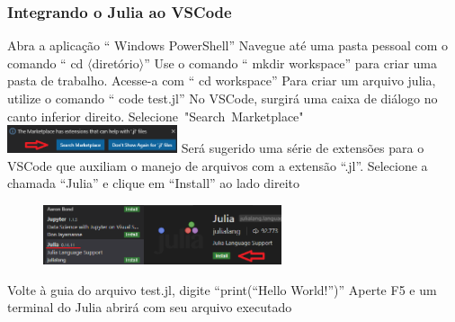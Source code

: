 \documentclass{beamer}
\begin{document}
	\begin{frame}
		\frametitle{\normalsize Integrando o Julia ao VSCode}
		\begin{algorithm}[H]
			\small
			Abra a aplicação ``\color{cyan} Windows PowerShell\color{black}''\; 
			Navegue até uma pasta pessoal com o comando ``\color{cyan} cd \color{black} $\langle$diretório$\rangle$''\;
			Use o comando ``\color{cyan} mkdir workspace\color{black}'' para criar uma pasta de trabalho. Acesse-a com ``\color{cyan} cd workspace\color{black}''\;
			Para criar um arquivo julia, utilize o comando ``\color{cyan} code test.jl\color{black}''\;
			No VSCode, surgirá uma caixa de diálogo no canto inferior direito. \mbox{Selecione "Search Marketplace" \includegraphics[width=5cm]{vscode1.png}}\;
			Será sugerido uma série de extensões para o VSCode que auxiliam o manejo de arquivos com a extensão ``.jl''. Selecione a chamada ``\color{cyan}Julia\color{black}'' e clique em ``\color{cyan}Install\color{black}'' ao lado direito\;
			\begin{figure}
				\includegraphics[width=7cm]{vscode2.png}	
			\end{figure}
			\vspace{-0.35cm}
			Volte à guia do arquivo \color{cyan}test.jl\color{black}, digite ``\color{olive}print\color{black}(\color{teal}``Hello World!''\color{black})''\; 
			Aperte F5 e um terminal do Julia abrirá com seu arquivo executado\;
			
		\end{algorithm}		
	\end{frame}
	
\end{document}
